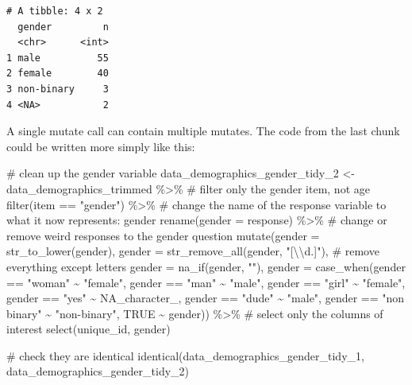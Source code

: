 \documentclass[
  letterpaper,
  DIV=11,
  numbers=noendperiod]{scrreprt}
\newenvironment{Shaded}{\begin{snugshade}}{\end{snugshade}}
\newcommand{\AttributeTok}[1]{\textcolor[rgb]{0.40,0.45,0.13}{#1}}
\newcommand{\CommentTok}[1]{\textcolor[rgb]{0.37,0.37,0.37}{#1}}
\newcommand{\ConstantTok}[1]{\textcolor[rgb]{0.56,0.35,0.01}{#1}}
\newcommand{\FunctionTok}[1]{\textcolor[rgb]{0.28,0.35,0.67}{#1}}
\newcommand{\NormalTok}[1]{\textcolor[rgb]{0.00,0.23,0.31}{#1}}
\newcommand{\OtherTok}[1]{\textcolor[rgb]{0.00,0.23,0.31}{#1}}
\newcommand{\SpecialCharTok}[1]{\textcolor[rgb]{0.37,0.37,0.37}{#1}}
\newcommand{\StringTok}[1]{\textcolor[rgb]{0.13,0.47,0.30}{#1}}
\begin{document}
\begin{verbatim}
# A tibble: 4 x 2
  gender         n
  <chr>      <int>
1 male          55
2 female        40
3 non-binary     3
4 <NA>           2
\end{verbatim}

A single mutate call can contain multiple mutates. The code from the
last chunk could be written more simply like this:

\begin{Shaded}
\begin{Highlighting}[]
\CommentTok{\# clean up the gender variable}
\NormalTok{data\_demographics\_gender\_tidy\_2 }\OtherTok{\textless{}{-}}\NormalTok{ data\_demographics\_trimmed }\SpecialCharTok{\%\textgreater{}\%}
  \CommentTok{\# filter only the gender item, not age}
  \FunctionTok{filter}\NormalTok{(item }\SpecialCharTok{==} \StringTok{"gender"}\NormalTok{) }\SpecialCharTok{\%\textgreater{}\%}
  \CommentTok{\# change the name of the response variable to what it now represents: gender}
  \FunctionTok{rename}\NormalTok{(}\AttributeTok{gender =}\NormalTok{ response) }\SpecialCharTok{\%\textgreater{}\%}
  \CommentTok{\# change or remove weird responses to the gender question}
  \FunctionTok{mutate}\NormalTok{(}\AttributeTok{gender =} \FunctionTok{str\_to\_lower}\NormalTok{(gender),}
         \AttributeTok{gender =} \FunctionTok{str\_remove\_all}\NormalTok{(gender, }\StringTok{"[}\SpecialCharTok{\textbackslash{}\textbackslash{}}\StringTok{d.]"}\NormalTok{), }\CommentTok{\# remove everything except letters}
         \AttributeTok{gender =} \FunctionTok{na\_if}\NormalTok{(gender, }\StringTok{""}\NormalTok{), }
         \AttributeTok{gender =} \FunctionTok{case\_when}\NormalTok{(gender }\SpecialCharTok{==} \StringTok{"woman"} \SpecialCharTok{\textasciitilde{}} \StringTok{"female"}\NormalTok{,}
\NormalTok{                            gender }\SpecialCharTok{==} \StringTok{"man"} \SpecialCharTok{\textasciitilde{}} \StringTok{"male"}\NormalTok{,}
\NormalTok{                            gender }\SpecialCharTok{==} \StringTok{"girl"} \SpecialCharTok{\textasciitilde{}} \StringTok{"female"}\NormalTok{,}
\NormalTok{                            gender }\SpecialCharTok{==} \StringTok{"yes"} \SpecialCharTok{\textasciitilde{}} \ConstantTok{NA\_character\_}\NormalTok{,}
\NormalTok{                            gender }\SpecialCharTok{==} \StringTok{"dude"} \SpecialCharTok{\textasciitilde{}} \StringTok{"male"}\NormalTok{,}
\NormalTok{                            gender }\SpecialCharTok{==} \StringTok{"non binary"} \SpecialCharTok{\textasciitilde{}} \StringTok{"non{-}binary"}\NormalTok{,}
                            \ConstantTok{TRUE} \SpecialCharTok{\textasciitilde{}}\NormalTok{ gender)) }\SpecialCharTok{\%\textgreater{}\%}
  \CommentTok{\# select only the columns of interest}
  \FunctionTok{select}\NormalTok{(unique\_id, gender)}

\CommentTok{\# check they are identical}
\FunctionTok{identical}\NormalTok{(data\_demographics\_gender\_tidy\_1, data\_demographics\_gender\_tidy\_2)}
\end{Highlighting}
\end{Shaded}
\end{document}

